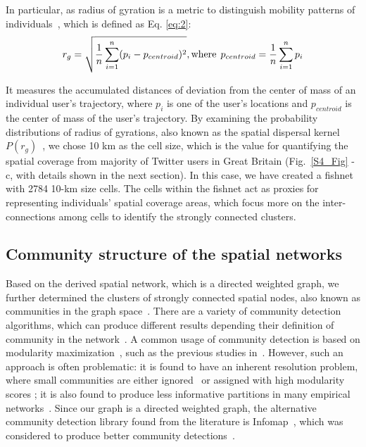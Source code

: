 \documentclass[10pt,letterpaper]{article}
\begin{document}
In particular, as radius of gyration is a metric to distinguish mobility patterns of individuals~\cite{gonzalez2008}, which is defined as Eq. \eqref{eq:2}:
\begin{equation} \label{eq:2}
r_{g} = \sqrt{\frac{1}{n}\sum_{i=1}^{n}(p_{i} -  p_{centroid})^{2}}, \textrm{where}\hspace{1ex} p_{centroid} = \frac{1}{n}\sum_{i=1}^{n}p_{i}
\end{equation}

\noindent It measures the accumulated distances of deviation from the center of mass of an individual user's trajectory, where $p_{i}$ is one of the user's locations and $p_{centroid}$ is the center of mass of the user's trajectory.
By examining the probability distributions of radius of gyrations, also known as the spatial dispersal kernel $P(r_g)$~\cite{brockmann2006}, we chose 10 km as the cell size, which is the value for quantifying the spatial coverage from majority of Twitter users in Great Britain (Fig.~\ref{S4_Fig} - c, with details shown in the next section). 
In this case, we have created a fishnet with 2784 10-km size cells.
The cells within the fishnet act as proxies for representing individuals' spatial coverage areas, which focus more on the inter-connections among cells to identify the strongly connected clusters. 

\subsection*{Community structure of the spatial networks}
Based on the derived spatial network, which is a directed weighted graph, we further determined the clusters of strongly connected spatial nodes, also known as communities in the graph space~\cite{coscia2011}. 
There are a variety of community detection algorithms, which can produce different results depending their definition of community in the network~\cite{coscia2011}.
A common usage of community detection is based on modularity maximization~\cite{newman2006}, such as the previous studies in~\cite{hawelka,ratti2010,song2012}.
However, such an approach is often problematic: it is found to have an inherent resolution problem, where small communities are either ignored~\cite{fortunato2007} or assigned with high modularity scores \cite{guimera2004}; it is also found to produce less informative partitions in many empirical networks~\cite{good2010}.
Since our graph is a directed weighted graph, the alternative community detection library found from the literature is Infomap~\cite{domenico2015,rosvall2008}, which was considered to produce better community detections~\cite{lancichinetti2009}.
\end{document}
